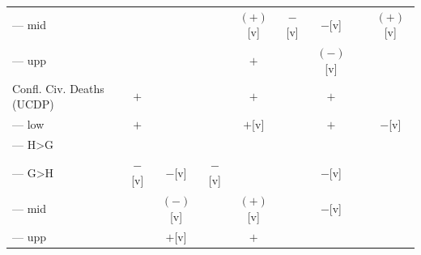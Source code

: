 \documentclass[12pt]{article}
\begin{document}
\begin{table}
\begin{tabular}{lcccccccc}
--- mid                   &                     &                     &              & $(+)$[v]        & $-$[v]   & $-$[v]                        &                                & $(+)$[v] \\
--- upp                   &                     &                     &              & $+$             &          & $(-)$[v]                      &                                & \\
Confl. Civ. Deaths (UCDP) & $+$                 &                     &              & $+$             &          & $+$                           &                                & \\
--- low                   & $+$                 &                     &              & $+$[v]          &          & $+$                           &                                & $-$[v] \\
--- H>G                   &                     &                     &              &                 &          &                               &                                & \\
--- G>H                   & $-$[v]              & $-$[v]              & $-$[v]       &                 &          & $-$[v]                        &                                & \\
--- mid                   &                     & $(-)$[v]            &              & $(+)$[v]        &          & $-$[v]                        &                                & \\
--- upp                   &                     & $+$[v]              &              & $+$             &          &                               &                                & \\
\bottomrule
\end{tabular}
\end{table}
\end{document}
